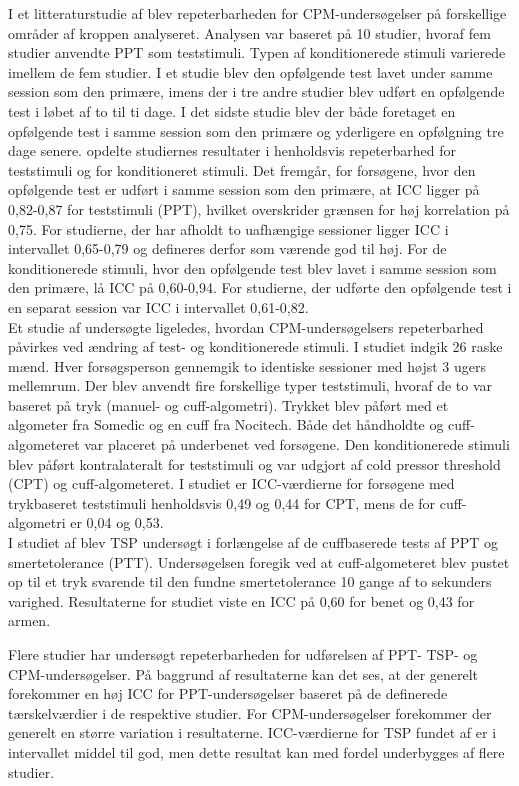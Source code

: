 I et litteraturstudie af  blev repeterbarheden for CPM-undersøgelser på forskellige områder af kroppen analyseret. Analysen var baseret på 10 studier, hvoraf fem studier anvendte PPT som teststimuli. Typen af konditionerede stimuli varierede imellem de fem studier. I et studie blev den opfølgende test lavet under samme session som den primære, imens der i tre andre studier blev udført en opfølgende test i løbet af to til ti dage. I det sidste studie blev der både foretaget en opfølgende test i samme session som den primære og yderligere en opfølgning tre dage senere.  opdelte studiernes resultater i henholdsvis repeterbarhed for teststimuli og for konditioneret stimuli. Det fremgår, for forsøgene, hvor den opfølgende test er udført i samme session som den primære, at ICC ligger på 0,82-0,87 for teststimuli (PPT), hvilket overskrider grænsen for høj korrelation på 0,75. For studierne, der har afholdt to uafhængige sessioner ligger ICC i intervallet 0,65-0,79 og defineres derfor som værende god til høj. For de konditionerede stimuli, hvor den opfølgende test blev lavet i samme session som den primære, lå ICC på 0,60-0,94. For studierne, der udførte den opfølgende test i en separat session var ICC i intervallet 0,61-0,82.\\ 
Et studie af  undersøgte ligeledes, hvordan CPM-undersøgelsers repeterbarhed påvirkes ved ændring af test- og konditionerede stimuli. I studiet indgik 26 raske mænd. Hver forsøgsperson gennemgik to identiske sessioner med højst 3 ugers mellemrum. Der blev anvendt fire forskellige typer teststimuli, hvoraf de to var baseret på tryk (manuel- og cuff-algometri). Trykket blev påført med et algometer fra Somedic og en cuff fra Nocitech. Både det håndholdte og cuff-algometeret var placeret på underbenet ved forsøgene. Den konditionerede stimuli blev påført kontralateralt for teststimuli og var udgjort af cold pressor threshold (CPT) og cuff-algometeret. I studiet er ICC-værdierne for forsøgene med trykbaseret teststimuli henholdsvis 0,49 og 0,44 for CPT, mens de for cuff-algometri er 0,04 og 0,53.\\ 
I studiet af  blev TSP undersøgt i forlængelse af de cuffbaserede tests af PPT og smertetolerance (PTT). Undersøgelsen foregik ved at cuff-algometeret blev pustet op til et tryk svarende til den fundne smertetolerance 10 gange af to sekunders varighed. Resultaterne for studiet viste en ICC på 0,60 for benet og 0,43 for armen. 

Flere studier har undersøgt repeterbarheden for udførelsen af PPT- TSP- og CPM-undersøgelser. På baggrund af resultaterne kan det ses, at der generelt forekommer en høj ICC for PPT-undersøgelser baseret på de definerede tærskelværdier i de respektive studier. For CPM-undersøgelser forekommer der generelt en større variation i resultaterne. ICC-værdierne for TSP fundet af  er i intervallet middel til god, men dette resultat kan med fordel underbygges af flere studier. 


